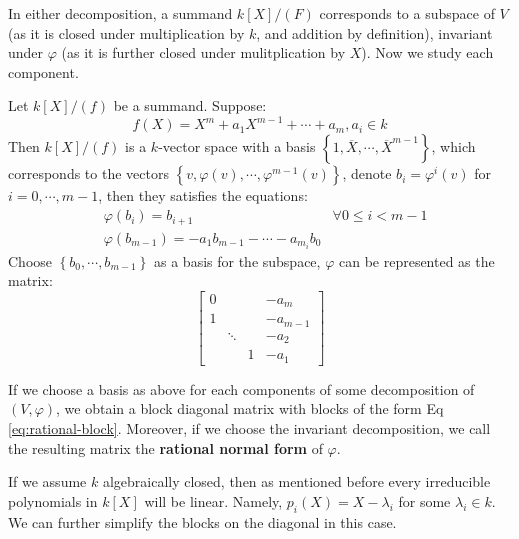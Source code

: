 \documentclass{note-eng}
\begin{document}
In either decomposition, a summand $k[X] / (F)$ corresponds to a subspace of $V$ (as it is closed under multiplication by $k$, and addition by definition), invariant under $\varphi$ (as it is further closed under mulitplication by $X$). Now we study each component.

Let $k[X] / (f)$ be a summand. Suppose:
$$f(X) = X^{m} + a_{1} X^{m - 1} + \cdots + a_m, a_i \in k$$
Then $k[X] / (f)$ is a $k$-vector space with a basis $\left\lbrace 1, \overline{X}, \cdots, \overline{X}^{m - 1} \right\rbrace$, which corresponds to the vectors $\left\lbrace v, \varphi(v), \cdots, \varphi^{m - 1} (v) \right\rbrace$, denote $b_i = \varphi^i(v)$ for $i = 0, \cdots, m - 1$, then they satisfies the equations:
$$
    \begin{aligned}
        &\varphi(b_{i}) = b_{i + 1}  & \forall 0 \le i \lt m - 1\\
        &\varphi(b_{m - 1}) = - a_{1} b_{m - 1} - \cdots - a_{m_i} b_{0}
    \end{aligned}
$$
Choose $\left\lbrace b_{0}, \cdots, b_{m - 1} \right\rbrace$ as a basis for the subspace, $\varphi$ can be represented as the matrix:
\begin{equation}\label{eq:rational-block}
    \begin{bmatrix}
        0 & & & -a_m\\
        1 & & & -a_{m - 1}\\
        & \ddots & & -a_2\\
        & &1 &- a_1
    \end{bmatrix}
\end{equation}

If we choose a basis as above for each components of some decomposition of $(V, \varphi)$, we obtain a block diagonal matrix with blocks of the form Eq \ref{eq:rational-block}. Moreover, if we choose the invariant decomposition, we call the resulting matrix the \textbf{rational normal form} of $\varphi$.

If we assume $k$ algebraically closed, then as mentioned before every irreducible polynomials in $k[X]$ will be linear. Namely, $p_i(X) = X - \lambda_i$ for some $\lambda_i \in k$. We can further simplify the blocks on the diagonal in this case.
\end{document}
